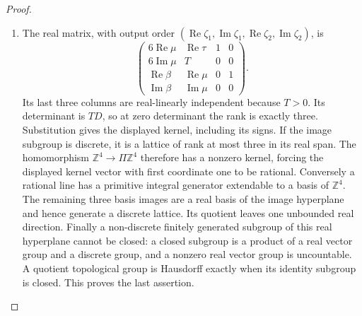 \begin{proof}
\begin{enumerate}[label=\arabic*.,leftmargin=*]
\item The real matrix, with output order
\((\operatorname{Re}\zeta_1,\operatorname{Im}\zeta_1,
\operatorname{Re}\zeta_2,\operatorname{Im}\zeta_2)\), is
\[
 \begin{pmatrix}6\operatorname{Re}\mu&\operatorname{Re}\tau&1&0\\
 6\operatorname{Im}\mu&T&0&0\\
 \operatorname{Re}\beta&\operatorname{Re}\mu&0&1\\
 \operatorname{Im}\beta&\operatorname{Im}\mu&0&0\end{pmatrix}.
\]
Its last three columns are real-linearly independent because \(T>0\).
Its determinant is \(TD\), so at zero determinant the rank is exactly
three. Substitution gives the displayed kernel, including its signs.
If the image subgroup is discrete, it is a lattice of rank at most three
in its real span. The homomorphism \(\mathbb Z^4\to\Pi\mathbb Z^4\)
therefore has a nonzero kernel, forcing the displayed kernel vector with
first coordinate one to be rational. Conversely a rational line has a
primitive integral generator extendable to a basis of \(\mathbb Z^4\).
The remaining three basis images are a real basis of the image hyperplane
and hence generate a discrete lattice. Its quotient leaves one unbounded
real direction. Finally a non-discrete finitely generated subgroup of
this real hyperplane cannot be closed: a closed subgroup is a product of
a real vector group and a discrete group, and a nonzero real vector group
is uncountable. A quotient topological group is Hausdorff exactly when its
identity subgroup is closed. This proves the last assertion.
\end{enumerate}
\end{proof}

